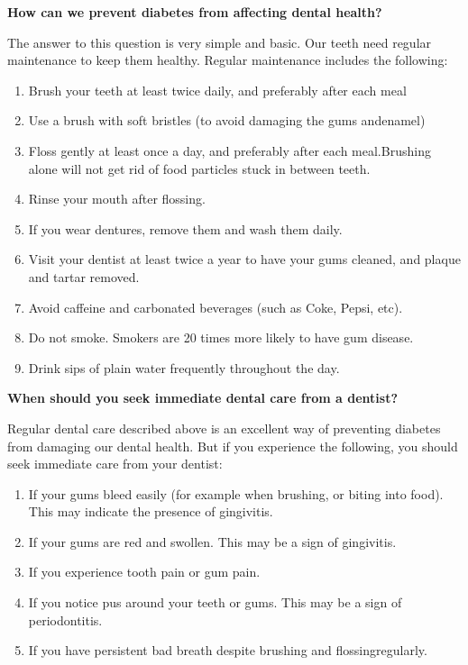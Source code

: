 \noindent\textbf{How can we prevent diabetes from affecting dental health?}

The answer to this question is very simple and basic. Our teeth need regular maintenance to keep them healthy. Regular maintenance includes the following:

\begin{enumerate}[•]
\itemsep=0pt
\item Brush your teeth at least twice daily, and preferably after each meal
\item Use a brush with soft bristles (to avoid damaging the gums and\break enamel)
\item Floss gently at least once a day, and preferably after each meal.\break Brushing alone will not get rid of food particles stuck in between teeth.
\item Rinse your mouth after flossing.
\item If you wear dentures, remove them and wash them daily.
\item Visit your dentist at least twice a year to have your gums cleaned, and plaque and tartar removed.
\item Avoid caffeine and carbonated beverages (such as Coke, Pepsi, etc).
\item Do not smoke. Smokers are 20 times more likely to have gum disease.
\item Drink sips of plain water frequently throughout the day.
\end{enumerate}

\noindent\textbf{When should you seek immediate dental care from a dentist?}

Regular dental care described above is an excellent way of preve\-nting diabetes from damaging our dental health. But if you experience the following, you should seek immediate care from your dentist:

\begin{enumerate}[•]
\itemsep=0pt
\item If your gums bleed easily (for example when brushing, or biting into food). This may indicate the presence of gingivitis.
\item If your gums are red and swollen. This may be a sign of gingivitis.
\item If you experience tooth pain or gum pain.
\item If you notice pus around your teeth or gums. This may be a sign of periodontitis.
\item If you have persistent bad breath despite brushing and flossing\break regularly.
\end{enumerate}

